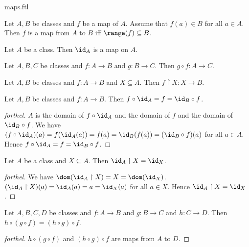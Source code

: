 \documentclass{naproche-library}
\begin{document}
\begin{smodule}{maps.ftl}
  \begin{proposition}
    Let $A, B$ be classes and $f$ be a map of $A$.
    Assume that $f(a) \in B$ for all $a \in A$.
    Then $f$ is a map from $A$ to $B$ iff $\range(f) \subseteq B$.
  \end{proposition}

  \begin{proposition}[forthel,id=FOUNDATIONS_06_5104361690628096]
    Let $A$ be a class.
    Then $\id_{A}$ is a map on $A$.
  \end{proposition}

  \begin{proposition}[forthel,id=FOUNDATIONS_06_1706446651654144]
    Let $A, B, C$ be classes and $f : A \to B$ and $g : B \to C$.
    Then $g \circ f : A \to C$.
  \end{proposition}

  \begin{proposition}[forthel,id=FOUNDATIONS_06_4078561256275968]
    Let $A, B$ be classes and $f : A \to B$ and $X \subseteq A$.
    Then $f \restriction X : X \to B$.
  \end{proposition}

  \begin{proposition}[forthel,id=FOUNDATIONS_06_3964401904254976]
    Let $A, B$ be classes and $f : A \to B$.
    Then $f \circ \id_{A} = f = \id_{B} \circ f$.
  \end{proposition}
  \begin{proof}[forthel]
    $A$ is the domain of $f \circ \id_{A}$ and the domain of $f$ and the domain of $\id_{B} \circ f$.
    We have $(f \circ \id_{A})(a)
      = f(\id_{A}(a))
      = f(a)
      = \id_{B}(f(a))
      = (\id_{B} \circ f)(a)$
    for all $a \in A$.
    Hence $f \circ \id_{A}
      = f
      = \id_{B} \circ f$.
  \end{proof}

  \begin{proposition}[forthel,id=FOUNDATIONS_06_3118771061391360]
    Let $A$ be a class and $X \subseteq A$.
    Then $\id_{A} \restriction X = \id_{X}$.
  \end{proposition}
  \begin{proof}[forthel]
    We have $\dom(\id_{A} \restriction X)
      = X
      = \dom(\id_{X})$.
    $(\id_{A} \restriction X)(a)
      = \id_{A}(a)
      = a
      = \id_{X}(a)$
    for all $a \in X$.
    Hence $\id_{A} \restriction X = \id_{X}$.
  \end{proof}

  \begin{proposition}[forthel,id=FOUNDATIONS_06_6866147389472768]
    Let $A, B, C, D$ be classes and $f : A \to B$ and $g : B \to C$ and $h : C \to D$.
    Then $h \circ (g \circ f) = (h \circ g) \circ f$.
  \end{proposition}
  \begin{proof}[forthel]
    $h \circ (g \circ f)$ and $(h \circ g) \circ f$ are maps from $A$ to $D$.


\end{proof}
\end{smodule}
\end{document}
